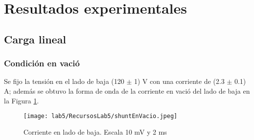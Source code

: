 \documentclass[11pt,letterpaper]{article}     %
\begin{document}
\section{Resultados experimentales}



\subsection{Carga lineal}
\subsubsection{Condición en vació}
Se fijo la tensión en el lado de baja (120 $\pm$ 1) V con una corriente de (2.3 $\pm$ 0.1) A; además se obtuvo la forma de onda de la corriente en vació del lado de baja en la Figura \ref{ShuntEnVacio}.
\begin{figure}[H]
    \centering
    \texttt{[image: lab5/RecursosLab5/shuntEnVacio.jpeg]}
    \caption{Corriente en lado de baja. Escala 10 mV y 2 ms }
    \label{ShuntEnVacio}
\end{figure}
\end{document}

